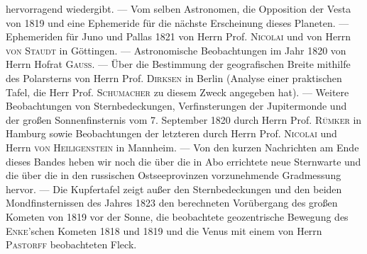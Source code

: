 hervorragend wiedergibt. --- Vom selben Astronomen, die Opposition der Vesta von 1819 und eine Ephemeride für die nächste Erscheinung dieses Planeten. --- Ephemeriden für Juno und Pallas 1821 von Herrn Prof. \textsc{Nicolai} und von Herrn \textsc{von Staudt} in Göttingen. --- Astronomische Beobachtungen im Jahr 1820 von Herrn Hofrat \textsc{Gauss}. --- Über die Bestimmung der geografischen Breite mithilfe des Polarsterns von Herrn Prof. \textsc{Dirksen} in Berlin (Analyse einer praktischen Tafel, die Herr Prof. \textsc{Schumacher} zu diesem Zweck angegeben hat). --- Weitere Beobachtungen von Sternbedeckungen, Verfinsterungen der Jupitermonde und der großen Sonnenfinsternis vom 7. September 1820 durch Herrn Prof. \textsc{Rümker} in Hamburg sowie Beobachtungen der letzteren durch Herrn Prof. \textsc{Nicolai} und Herrn \textsc{von Heiligenstein} in Mannheim. --- Von den kurzen Nachrichten am Ende dieses Bandes heben wir noch die über die in Abo errichtete neue Sternwarte und die über die in den russischen Ostseeprovinzen vorzunehmende Gradmessung hervor. --- Die Kupfertafel zeigt außer den Sternbedeckungen und den beiden Mondfinsternissen des Jahres 1823 den berechneten Vorübergang des großen Kometen von 1819 vor der Sonne, die beobachtete geozentrische Bewegung des \textsc{Enke}'schen Kometen 1818 und 1819 und die Venus mit einem von Herrn \textsc{Pastorff} beobachteten Fleck.
\par\clearpage\endgroup
